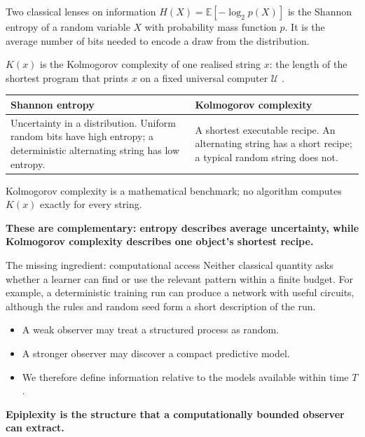 \documentclass[aspectratio=169,notheorems]{beamer}
\theoremstyle{definition}
\newcommand{\E}{\mathbb{E}}
\newcommand{\take}[1]{\par\vspace{0.35em}{\color{myblue}\hrule height 0.6pt}\vspace{0.25em}\noindent\textbf{#1}\par}
\begin{document}
\begin{frame}{Two classical lenses on information}
\small
$H(X)=\E[-\log_2 p(X)]$ is the Shannon entropy of a random variable $X$ with probability mass function $p$.
It is the average number of bits needed to encode a draw from the distribution.

\medskip
$K(x)$ is the Kolmogorov complexity of one realised string $x$: the length of the shortest program that prints
$x$ on a fixed universal computer $\mathcal U$ \citep{livitanyi2008}.

\smallskip
\renewcommand{\arraystretch}{1.15}
\begin{tabular}{@{}>{\raggedright\arraybackslash}p{}>{\raggedright\arraybackslash}p{}@{}}
\toprule
\textbf{Shannon entropy} & \textbf{Kolmogorov complexity} \\
\midrule
Uncertainty in a distribution. Uniform random bits have high entropy; a deterministic alternating string has low entropy. &
A shortest executable recipe. An alternating string has a short recipe; a typical random string does not. \\
\bottomrule
\end{tabular}
\smallskip
Kolmogorov complexity is a mathematical benchmark; no algorithm computes $K(x)$ exactly for every string.
\normalsize
\take{These are complementary: entropy describes average uncertainty, while Kolmogorov complexity describes one object's shortest recipe.}
\end{frame}
\begin{frame}{The missing ingredient: computational access}
\small
Neither classical quantity asks whether a learner can find or use the relevant pattern within a finite budget.
For example, a deterministic training run can produce a network with useful circuits, although the rules and
random seed form a short description of the run.

\medskip
\begin{itemize}\setlength{\itemsep}{0.35em}
\item A weak observer may treat a structured process as random.
\item A stronger observer may discover a compact predictive model.
\item We therefore define information relative to the models available within time $T$.
\end{itemize}

\take{Epiplexity is the structure that a computationally bounded observer can extract.}
\end{frame}
\end{document}
